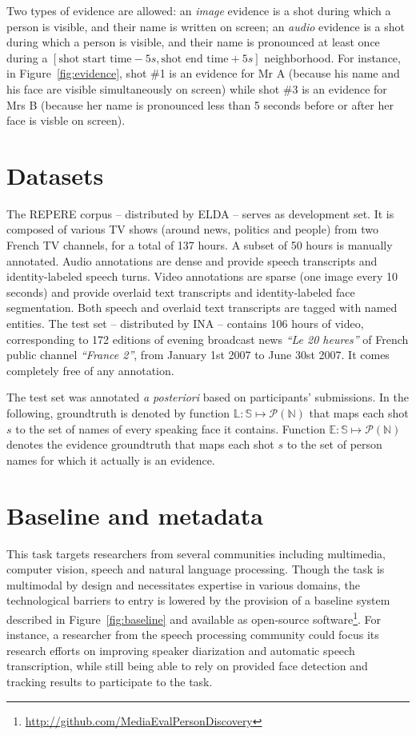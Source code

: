 \documentclass{acm_proc_article-me}
\newcommand\refEvidences{\mathbb{E}}
\newcommand\refLabels{\mathbb{L}}
\newcommand\refNames{\mathbb{N}}
\newcommand\shots{\mathbb{S}}
\begin{document}
Two types of evidence are allowed: an \emph{image} evidence is a shot during which a person is visible, and their name is written on screen; an \emph{audio} evidence is a shot during which a person is visible, and their name is pronounced at least once during a $[\text{shot start time} - 5s, \text{shot end time} + 5s ]$ neighborhood.
For instance, in Figure~\ref{fig:evidence}, shot \#1 is an evidence for Mr A (because his name and his face are visible simultaneously on screen) while shot \#3 is an evidence for Mrs B (because her name is pronounced less than 5 seconds before or after her face is visble on screen).



\section{Datasets}

The REPERE corpus -- distributed by ELDA -- serves as development set. It is composed of various TV shows (around news, politics and people) from two French TV channels, for a total of 137 hours. A subset of 50 hours is manually annotated. Audio annotations are dense and provide speech transcripts and identity-labeled speech turns. Video annotations are sparse (one image every 10 seconds) and provide overlaid text transcripts and identity-labeled face segmentation. Both speech and overlaid text transcripts are tagged with named entities.
The test set -- distributed by INA -- contains 106 hours of video, corresponding to 172 editions of evening broadcast news \emph{``Le 20 heures''} of French public channel \emph{``France 2''}, from January 1st 2007 to June 30st 2007. It comes completely free of any annotation.

The test set was annotated \emph{a posteriori} based on participants' submissions. In the following, groundtruth is denoted by function $\refLabels : \shots \mapsto \mathcal{P}(\refNames)$ that maps each shot $s$ to the set of names of every speaking face it contains. Function $\refEvidences : \shots \mapsto \mathcal{P}(\refNames)$ denotes the evidence groundtruth that maps each shot $s$ to the set of person names for which it actually is an evidence.

\section{Baseline and metadata}

This task targets researchers from several communities including multimedia, computer vision, speech and natural language processing. Though the task is multimodal by design and necessitates expertise in various domains, the technological barriers to entry is lowered by the provision of a baseline system described in Figure~\ref{fig:baseline} and available as open-source software\footnote{\url{http://github.com/MediaEvalPersonDiscovery}}.
For instance, a researcher from the speech processing community could focus its research efforts on improving speaker diarization and automatic speech transcription, while still being able to rely on provided face detection and tracking results to participate to the task.
\end{document}
